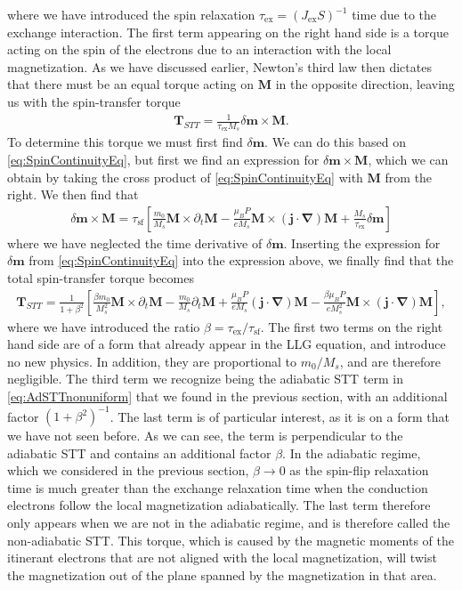 where we have introduced the spin relaxation $\tau_{\textrm{ex}} = (J_{\textrm{ex}}S)^{-1}$ time due to the exchange interaction. The first term appearing on the right hand side is a torque acting on the spin of the electrons due to an interaction with the local magnetization. As we have discussed earlier, Newton's third law then dictates that there must be an equal torque acting on $\mathbold{M}$ in the opposite direction, leaving us with the spin-transfer torque
\begin{align}
\mathbold{T}_{STT} = \frac{1}{\tau_{\textrm{ex}}M_s}\delta\mathbold{m}\times\mathbold{M}.
\end{align}
To determine this torque we must first find $\delta\mathbold{m}$. We can do this based on \eqref{eq:SpinContinuityEq}, but first we find an expression for $\delta \mathbold{m} \times \mathbold{M}$, which we can obtain by taking the cross product of \eqref{eq:SpinContinuityEq} with $\mathbold{M}$ from the right. We then find that
\begin{align}
\delta\mathbold{m}\times\mathbold{M} = \tau_{\textrm{sf}}\left[\frac{m_0}{M_s}\mathbold{M}\times\partial_t\mathbold{M} - \frac{\mu_B P}{e M_s} \mathbold{M}\times(\mathbold{j}\cdot\mathbold{\nabla})\mathbold{M} + \frac{M_s}{\tau_{\textrm{ex}}}\delta\mathbold{m} \right]
\end{align}
where we have neglected the time derivative of $\delta\mathbold{m}$. Inserting the expression for $\delta\mathbold{m}$ from \eqref{eq:SpinContinuityEq} into the expression above, we finally find that the total spin-transfer torque becomes
\begin{align}
\mathbold{T}_{STT} = \frac{1}{1+\beta^2} \left[ \frac{\beta m_0}{M_s^2}\mathbold{M}\times\partial_t\mathbold{M} - \frac{m_0}{M_s} \partial_t\mathbold{M} + \frac{\mu_B P}{e M_s} (\mathbold{j}\cdot\mathbold{\nabla})\mathbold{M} - \frac{\beta \mu_B P}{e M_s^2} \mathbold{M}\times(\mathbold{j}\cdot\mathbold{\nabla})\mathbold{M}\right],
\end{align}
where we have introduced the ratio $\beta = \tau_{\textrm{ex}}/\tau_{\textrm{sf}}$. The first two terms on the right hand side are of a form that already appear in the LLG equation, and introduce no new physics. In addition, they are proportional to $m_0/M_s$, and are therefore negligible. The third term we recognize being the adiabatic STT term in \eqref{eq:AdSTTnonuniform} that we found in the previous section, with an additional factor $(1+\beta^2)^{-1}$. The last term is of particular interest, as it is on a form that we have not seen before. As we can see, the term is perpendicular to the adiabatic STT and contains an additional factor $\beta$. In the adiabatic regime, which we considered in the previous section, $\beta \rightarrow 0$ as the spin-flip relaxation time is much greater than the exchange relaxation time when the conduction electrons follow the local magnetization adiabatically. The last term therefore only appears when we are not in the adiabatic regime, and is therefore called the non-adiabatic STT. This torque, which is caused by the magnetic moments of the itinerant electrons that are not aligned with the local magnetization, will twist the magnetization out of the plane spanned by the magnetization in that area. 